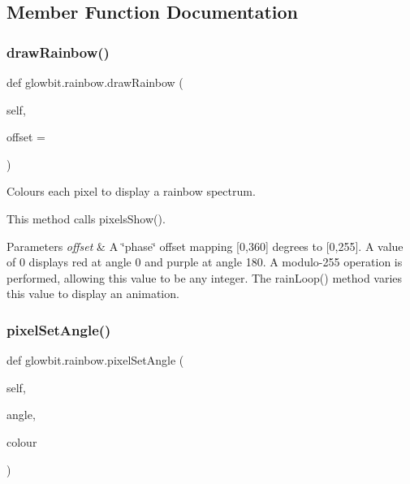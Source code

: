 \subsection{Member Function Documentation}
\mbox{\label{classglowbit_1_1rainbow_af03e480ce6a5d27780268b242a3fdfa7}} 
\subsubsection{\texorpdfstring{draw\+Rainbow()}{drawRainbow()}}
{\footnotesize\ttfamily def glowbit.\+rainbow.\+draw\+Rainbow (\begin{DoxyParamCaption}\item[{}]{self,  }\item[{}]{offset = {} }\end{DoxyParamCaption})}



Colours each pixel to display a rainbow spectrum. 

This method calls pixels\+Show().


\begin{DoxyParams}{Parameters}
{\em offset} & A \char`\"{}phase\char`\"{} offset mapping \mbox{[}0,360\mbox{]} degrees to \mbox{[}0,255\mbox{]}. A value of 0 displays red at angle 0 and purple at angle 180. A modulo-\/255 operation is performed, allowing this value to be any integer. The rain\+Loop() method varies this value to display an animation. \\
\hline
\end{DoxyParams}
\mbox{\label{classglowbit_1_1rainbow_a0940825ae934617f95b96e472923f07a}} 
\subsubsection{\texorpdfstring{pixel\+Set\+Angle()}{pixelSetAngle()}}
{\footnotesize\ttfamily def glowbit.\+rainbow.\+pixel\+Set\+Angle (\begin{DoxyParamCaption}\item[{}]{self,  }\item[{}]{angle,  }\item[{}]{colour }\end{DoxyParamCaption})}



